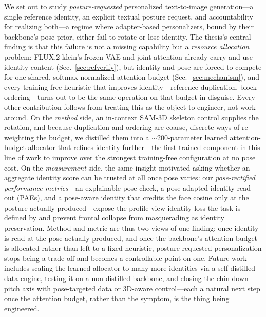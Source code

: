 \label{sec:conclusion}
We set out to study \emph{posture-requested} personalized text-to-image
generation---a single reference identity, an explicit textual posture
request, and accountability for realizing both---a regime where adapter-based
personalizers, bound by their backbone's pose prior, either fail to rotate or
lose identity. The thesis's central finding is that this failure is not a
missing capability but a \emph{resource allocation} problem: FLUX.2-klein's
frozen VAE and joint attention already carry and use identity content
(Sec.~\ref{sec:refverify}), but identity and pose are forced to compete for
one shared, softmax-normalized attention budget (Sec.~\ref{sec:mechanism}),
and every training-free heuristic that improves identity---reference
duplication, block ordering---turns out to be the same operation on that
budget in disguise. Every other contribution follows from treating this as
the object to engineer, not work around. On the \emph{method} side, an
in-context SAM-3D skeleton control supplies the rotation, and because
duplication and ordering are coarse, discrete ways of re-weighting the
budget, we distilled them into a $\sim$200-parameter learned attention-budget
allocator that refines identity further---the first trained component in
this line of work to improve over the strongest training-free configuration
at no pose cost. On the \emph{measurement} side, the same insight motivated
asking whether an aggregate identity score can be trusted at all once pose
varies: our \emph{pose-rectified performance metrics}---an explainable pose
check, a pose-adapted identity read-out (PAEs), and a pose-aware identity
that credits the face cosine only at the posture actually produced---expose
the profile-view identity loss the task is defined by and prevent frontal
collapse from masquerading as identity preservation. Method and metric are
thus two views of one finding: once identity is read at the pose actually
produced, and once the backbone's attention budget is allocated rather than
left to a fixed heuristic, posture-requested personalization stops being a
trade-off and becomes a controllable point on one. Future work includes
scaling the learned allocator to many more identities via a self-distilled
data engine, testing it on a non-distilled backbone, and closing the
chin-down pitch axis with pose-targeted data or 3D-aware control---each a
natural next step once the attention budget, rather than the symptom, is the
thing being engineered.
